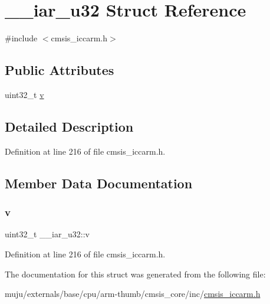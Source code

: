 \hypertarget{struct____iar__u32}{}\section{\+\_\+\+\_\+iar\+\_\+u32 Struct Reference}
\label{struct____iar__u32}


{\ttfamily \#include $<$cmsis\+\_\+iccarm.\+h$>$}

\subsection*{Public Attributes}
\begin{DoxyCompactItemize}
\item 
uint32\+\_\+t \hyperlink{struct____iar__u32_af8b16b2c629a3f2264c1af078ef2578a}{v}
\end{DoxyCompactItemize}


\subsection{Detailed Description}


Definition at line 216 of file cmsis\+\_\+iccarm.\+h.



\subsection{Member Data Documentation}
\mbox{\label{struct____iar__u32_af8b16b2c629a3f2264c1af078ef2578a}} 
\subsubsection{\texorpdfstring{v}{v}}
{\footnotesize\ttfamily uint32\+\_\+t \+\_\+\+\_\+iar\+\_\+u32\+::v}



Definition at line 216 of file cmsis\+\_\+iccarm.\+h.



The documentation for this struct was generated from the following file\+:\begin{DoxyCompactItemize}
\item 
muju/externals/base/cpu/arm-\/thumb/cmsis\+\_\+core/inc/\hyperlink{cmsis__iccarm_8h}{cmsis\+\_\+iccarm.\+h}\end{DoxyCompactItemize}
